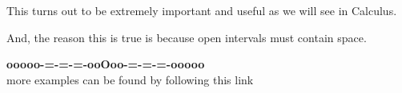 \documentclass{ximera}
\begin{document}
This turns out to be extremely important and useful as we will see in Calculus.


And, the reason this is true is because open intervals must contain space.



































































\begin{center}
\textbf{\textcolor{green!50!black}{ooooo-=-=-=-ooOoo-=-=-=-ooooo}} \\

more examples can be found by following this link\\ 

\end{center}
\end{document}

